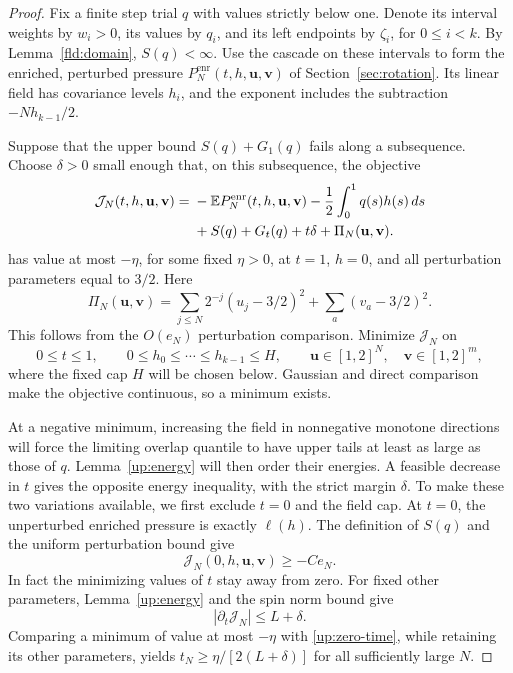 \begin{proof}
Fix a finite step trial \(q\) with values strictly below one. Denote
its interval weights by \(w_i>0\), its values by \(q_i\), and its
left endpoints by \(\zeta_i\), for \(0\le i<k\). By
Lemma~\ref{fld:domain}, \(S(q)<\infty\). Use the cascade on these
intervals to form the enriched, perturbed pressure
\(P_N^{\mathrm{enr}}(t,h,\mathbf u,\mathbf v)\) of
Section~\ref{sec:rotation}. Its linear field has covariance levels
\(h_i\), and the exponent includes the subtraction
\(-Nh_{k-1}/2\).

Suppose that the upper bound \(S(q)+G_1(q)\) fails along a
subsequence. Choose \(\delta>0\) small enough that, on this
subsequence, the objective
\begin{equation}\label{up:objective}
 \begin{aligned}
 \mathcal J_N(t,h,\mathbf u,\mathbf v)
 ={}&-\mathbb E P_N^{\mathrm{enr}}(t,h,\mathbf u,\mathbf v)
  -\frac12\int_0^1q(s)h(s)\,ds\\
 &+S(q)+G_t(q)+t\delta+\Pi_N(\mathbf u,\mathbf v).
 \end{aligned}
\end{equation}
has value at most \(-\eta\), for some fixed \(\eta>0\), at
\(t=1\), \(h=0\), and all perturbation parameters equal to
\(3/2\). Here
\[
 \Pi_N(\mathbf u,\mathbf v)
 =\sum_{j\le N}2^{-j}(u_j-3/2)^2
  +\sum_a(v_a-3/2)^2.
\]
This follows from the \(O(e_N)\) perturbation comparison. Minimize
\(\mathcal J_N\) on
\[
 0\le t\le1,\qquad
 0\le h_0\le\cdots\le h_{k-1}\le H,\qquad
 \mathbf u\in[1,2]^N,\quad\mathbf v\in[1,2]^m,
\]
where the fixed cap \(H\) will be chosen below. Gaussian and direct
comparison make the objective continuous, so a minimum exists.

At a negative minimum, increasing the field in nonnegative monotone
directions will force the limiting overlap quantile to have upper tails
at least as large as those of \(q\). Lemma~\ref{up:energy} will then
order their energies. A feasible decrease in \(t\) gives the
opposite energy inequality, with the strict margin \(\delta\).
To make these two variations available, we first exclude \(t=0\)
and the field cap. At \(t=0\), the unperturbed enriched pressure is exactly
\(\ell(h)\). The definition of \(S(q)\) and the uniform perturbation
bound give
\begin{equation}\label{up:zero-time}
 \mathcal J_N(0,h,\mathbf u,\mathbf v)\ge-Ce_N.
\end{equation}
In fact the minimizing values of \(t\) stay away from zero. For fixed
other parameters, Lemma~\ref{up:energy} and the spin norm bound give
\[
 \left|\partial_t\mathcal J_N\right|\le L+\delta.
\]
Comparing a minimum of value at most \(-\eta\) with
\eqref{up:zero-time}, while retaining its other parameters, yields
\(t_N\ge\eta/[2(L+\delta)]\) for all sufficiently large \(N\).


\end{proof}
